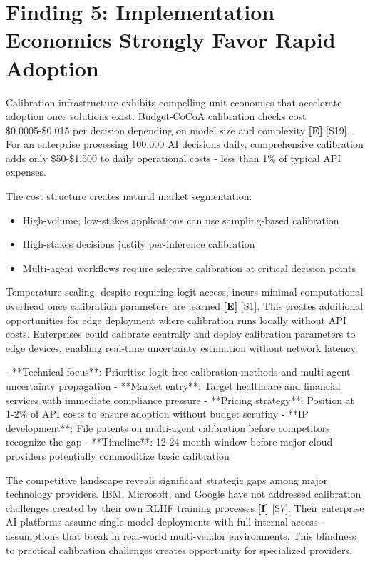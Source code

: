 \documentclass[a4paper,11pt]{article}
\newcommand{\elabel}{\textbf{\textcolor{ecolor}{[E]}}}
\newcommand{\ilabel}{\textbf{\textcolor{icolor}{[I]}}}
\begin{document}
\section{Finding 5: Implementation Economics Strongly Favor Rapid Adoption}

Calibration infrastructure exhibits compelling unit economics that accelerate adoption once solutions exist. Budget-CoCoA calibration checks cost \$0.0005-\$0.015 per decision depending on model size and complexity \elabel{} \textcolor{primary}{[S19]}. For an enterprise processing 100,000 AI decisions daily, comprehensive calibration adds only \$50-\$1,500 to daily operational costs - less than 1\% of typical API expenses.


The cost structure creates natural market segmentation:

\begin{itemize}
  \item High-volume, low-stakes applications can use sampling-based calibration
  \item High-stakes decisions justify per-inference calibration
  \item Multi-agent workflows require selective calibration at critical decision points
\end{itemize}

Temperature scaling, despite requiring logit access, incurs minimal computational overhead once calibration parameters are learned \elabel{} \textcolor{primary}{[S1]}. This creates additional opportunities for edge deployment where calibration runs locally without API costs. Enterprises could calibrate centrally and deploy calibration parameters to edge devices, enabling real-time uncertainty estimation without network latency.


\begin{decisionbox}
- **Technical focus**: Prioritize logit-free calibration methods and multi-agent uncertainty propagation
- **Market entry**: Target healthcare and financial services with immediate compliance pressure
- **Pricing strategy**: Position at 1-2\% of API costs to ensure adoption without budget scrutiny
- **IP development**: File patents on multi-agent calibration before competitors recognize the gap
- **Timeline**: 12-24 month window before major cloud providers potentially commoditize basic calibration
\end{decisionbox}


The competitive landscape reveals significant strategic gaps among major technology providers. IBM, Microsoft, and Google have not addressed calibration challenges created by their own RLHF training processes \ilabel{} \textcolor{primary}{[S7]}. Their enterprise AI platforms assume single-model deployments with full internal access - assumptions that break in real-world multi-vendor environments. This blindness to practical calibration challenges creates opportunity for specialized providers.
\end{document}
